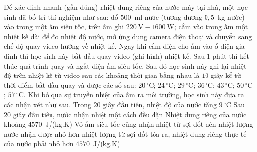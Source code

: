 	\begin{ex}%
		Để xác định nhanh (gần đúng) nhiệt dung riêng của nước máy tại nhà, một học sinh đã bố trí thí nghiệm như sau: đổ $500$~ml nước (tương đương $0{,}5$~kg nước) vào trong một ấm siêu tốc, trên ấm ghi $220~\text{V}-1600~\text{W}$; cắm vào trong ấm một nhiệt kế dài để đo nhiệt độ nước, mở ứng dụng camera điện thoại và chuyển sang chế độ quay video hướng về nhiệt kế. Ngay khi cắm điện cho ấm vào ổ điện gia đình thì học sinh này bắt đầu quay video (ghi hình) nhiệt kế. Sau $1$ phút thì kết thúc quá trình quay và ngắt điện ấm siêu tốc. Sau đó học sinh này ghi lại nhiệt độ trên nhiệt kế từ video sau các khoảng thời gian bằng nhau là $10$ giây kể từ thời điểm bắt đầu quay và được các số sau: $20\,^\circ\text{C}$; $24\,^\circ\text{C}$; $29\,^\circ\text{C}$; $36\,^\circ\text{C}$; $43\,^\circ\text{C}$; $50\,^\circ\text{C}$; $57\,^\circ\text{C}$. Khi bỏ qua sự truyền nhiệt của ấm ra môi trường, học sinh này đưa ra các nhận xét như sau.
		\choiceTFt
		{\True Trong $20$ giây đầu tiên, nhiệt độ của nước tăng $9\,^\circ\text{C}$}
		{\True Sau $20$ giây đầu tiên, nước nhận nhiệt một cách đều đặn}
		{\True Nhiệt dung riêng của nước khoảng $4570$~J/(kg.K)}
		{\True Vỏ ấm siêu tốc cũng nhận nhiệt từ sợi đốt nên nhiệt lượng nước nhận được nhỏ hơn nhiệt lượng từ sợi đốt tỏa ra, nhiệt dung riêng thực tế của nước phải nhỏ hơn $4570$~J/(kg.K)}
	\end{ex}


